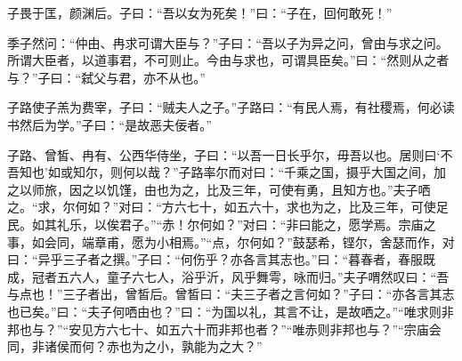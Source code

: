 \documentclass[12pt,a4paper]{ctexbook}
\begin{document}
子畏于匡，颜渊后。子曰：“吾以女为死矣！”曰：“子在，回何敢死！”\par
季子然问：“仲由、冉求可谓大臣与？”子曰：“吾以子为异之问，曾由与求之问。所谓大臣者，以道事君，不可则止。今由与求也，可谓具臣矣。”曰：“然则从之者与？”子曰：“弑父与君，亦不从也。”\par
子路使子羔为费宰，子曰：“贼夫人之子。”子路曰：“有民人焉，有社稷焉，何必读书然后为学。”子曰：“是故恶夫佞者。”\par
子路、曾皙、冉有、公西华侍坐，子曰：“以吾一日长乎尔，毋吾以也。居则曰‘不吾知也’如或知尔，则何以哉？”子路率尔而对曰：“千乘之国，摄乎大国之间，加之以师旅，因之以饥馑，由也为之，比及三年，可使有勇，且知方也。”夫子哂之。“求，尔何如？”对曰：“方六七十，如五六十，求也为之，比及三年，可使足民。如其礼乐，以俟君子。”“赤！尔何如？”对曰：“非曰能之，愿学焉。宗庙之事，如会同，端章甫，愿为小相焉。”“点，尔何如？”鼓瑟希，铿尔，舍瑟而作，对曰：“异乎三子者之撰。”子曰：“何伤乎？亦各言其志也。”曰：“暮春者，春服既成，冠者五六人，童子六七人，浴乎沂，风乎舞雩，咏而归。”夫子喟然叹曰：“吾与点也！”三子者出，曾皙后。曾皙曰：“夫三子者之言何如？”子曰：“亦各言其志也已矣。”曰：“夫子何哂由也？”曰：“为国以礼，其言不让，是故哂之。”“唯求则非邦也与？”“安见方六七十、如五六十而非邦也者？”“唯赤则非邦也与？”“宗庙会同，非诸侯而何？赤也为之小，孰能为之大？”\par
\end{document}
